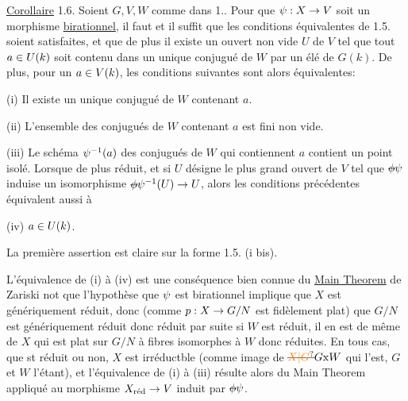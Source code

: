 \uline{Corollaire} 1.6. Soient $G,V,W$ comme dans 1..  Pour que $\psi:X\to V$ soit un morphisme \uline{birationnel}, il faut et il suffit que les conditions équivalentes de 1.5. soient satisfaites, et que de plus il existe un ouvert non vide $U$ de $V$ tel que tout $a\in U(k)$ soit contenu dans un unique conjugué de $W$ par un élé de $G(k)$. De plus, pour un $a\in V(k)$, les conditions suivantes sont alors équivalentes:

(i) Il existe un unique conjugué de $W$ contenant $a$.

(ii) L'ensemble des conjugués de $W$ contenant $a$ est fini non vide.

(iii) Le schéma $\psi^{-1}(a)$ des conjugués de $W$ qui contiennent $a$ contient un point isolé.
Lorsque  de plus  réduit, et si $U$ désigne le plus grand ouvert de $V$ tel que $\deleted{\phi}\handwritten{\psi}$ induise un isomorphisme $\deleted{\phi}\handwritten{\psi}^{-1}(U)\handwritten{\to}U$, alors les conditions précédentes équivalent aussi à

(iv) $a\in U(k)$.

La première assertion est claire sur la forme 1.5. (i bis).

L'équivalence de (i) à (iv) est une conséquence bien connue du \uline{Main Theorem} de Zariski  not que  l'hypothèse que $\psi$ est birationnel implique que  $X$ est génériquement réduit, donc (comme $p:X\to G/N$ est fidèlement plat) que $G/N$ est génériquement réduit donc réduit\handwritten{;} par suite si $W$ est réduit, il en est de même de $X$ qui est  plat sur $G/N$ à fibres  isomorphes à $W$ donc réduites. En tous cas, que  st réduit ou non, $X$ est irréductble (comme image de $\deleted{\unsure{X|G}}G\mathrm{x}W$ qui l'est, $G$ et $W$ l'étant), et l'équivalence de (i) à (iii) résulte alors du Main Theorem appliqué au morphisme $X_{\text{réd}}\to V$ induit par $\deleted{\phi}\handwritten{\psi}$.

